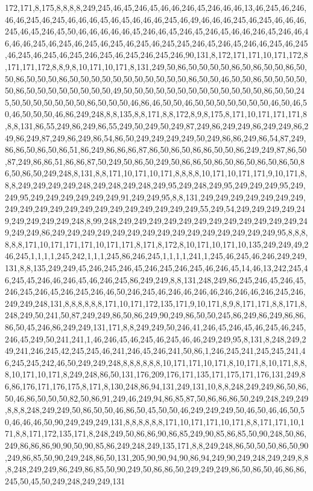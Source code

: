 172,171,8,175,8,8,8,8,249,245,46,45,246,45,46,46,246,45,246,46,46,13,46,245,46,246,46,46,245,46,245,46,46,46,45,46,45,46,46,46,245,46,49,46,46,46,245,46,245,46,46,46,245,46,45,246,45,50,46,46,46,46,46,45,246,46,45,246,45,246,45,46,46,246,45,246,46,46,46,46,245,46,245,46,245,46,245,46,245,46,245,245,246,45,246,45,246,46,245,46,245,46,245,46,245,46,245,246,245,46,245,246,245,246,90,131,8,172,171,171,10,171,172,8,171,171,172,8,8,9,8,10,171,10,171,8,131,249,50,86,50,50,50,50,86,50,86,50,50,86,50,50,86,50,50,50,86,50,50,50,50,50,50,50,50,50,50,50,86,50,50,46,50,50,86,50,50,50,50,50,86,50,50,50,50,50,50,50,50,49,50,50,50,50,50,50,50,50,50,50,50,50,50,86,50,50,245,50,50,50,50,50,50,50,86,50,50,50,46,86,46,50,50,46,50,50,50,50,50,50,50,46,50,46,50,46,50,50,50,46,86,249,248,8,8,135,8,8,171,8,8,172,8,9,8,175,8,171,10,171,171,171,8,8,8,131,86,55,249,86,249,86,55,249,50,249,50,249,87,249,86,249,249,86,249,249,86,249,86,249,87,249,86,249,86,54,86,50,249,249,249,249,50,249,86,86,249,86,54,87,249,86,86,50,86,50,86,51,86,249,86,86,86,87,86,50,86,50,86,86,50,50,86,249,249,87,86,50,87,249,86,86,51,86,86,87,50,249,50,86,50,249,50,86,86,50,86,50,86,50,86,50,86,50,86,50,86,50,249,248,8,131,8,8,171,10,171,10,171,8,8,8,8,10,171,10,171,171,9,10,171,8,8,8,249,249,249,249,248,249,248,249,248,249,95,249,248,249,95,249,249,249,95,249,249,95,249,249,249,249,249,249,91,249,249,95,8,8,131,249,249,249,249,249,249,249,249,249,249,249,249,249,249,249,249,249,249,249,249,55,249,54,249,249,249,249,249,249,249,249,249,248,8,99,248,249,249,249,249,249,249,249,249,249,249,249,249,249,249,249,86,249,249,249,249,249,249,249,249,249,249,249,249,249,249,249,95,8,8,8,8,8,8,171,10,171,171,171,10,171,171,8,171,8,172,8,10,171,10,171,10,135,249,249,49,246,245,1,1,1,1,245,242,1,1,1,245,86,246,245,1,1,1,1,241,1,245,46,245,46,246,249,249,131,8,8,135,249,249,45,246,245,246,45,246,245,246,245,46,246,45,14,46,13,242,245,46,245,45,246,46,246,45,46,246,245,86,249,249,8,8,131,248,249,86,245,246,45,246,45,246,245,246,45,246,245,246,46,50,246,245,46,246,46,246,46,246,246,46,246,245,246,249,249,248,131,8,8,8,8,8,8,171,10,171,172,135,171,9,10,171,8,9,8,171,171,8,8,171,8,248,249,50,241,50,87,249,249,86,50,86,249,90,249,86,50,50,245,86,249,86,249,86,86,86,50,45,246,86,249,249,131,171,8,8,249,249,50,246,41,246,45,246,45,46,245,46,245,246,45,249,50,241,241,1,46,246,45,46,245,46,245,46,46,249,249,95,8,131,8,248,249,249,241,246,245,42,245,245,46,241,246,45,246,241,50,86,1,246,245,241,245,245,241,46,245,245,242,46,50,249,249,248,8,8,8,8,8,8,10,171,171,10,171,8,10,171,8,10,171,8,8,8,10,171,10,171,8,249,248,86,50,131,176,209,176,171,135,171,175,171,176,131,249,86,86,176,171,176,175,8,171,8,130,248,86,94,131,249,131,10,8,8,248,249,249,86,50,86,50,46,86,50,50,50,82,50,86,91,249,46,249,94,86,85,87,50,86,86,86,50,249,248,249,249,8,8,8,248,249,249,50,86,50,50,46,86,50,45,50,50,46,249,249,249,50,46,50,46,46,50,50,46,46,46,50,90,249,249,249,131,8,8,8,8,8,8,171,10,171,171,10,171,8,8,171,171,10,171,8,8,171,172,135,171,8,248,249,50,86,86,90,86,85,249,90,85,86,85,50,90,248,50,86,249,86,86,86,90,90,50,90,85,86,249,248,249,135,171,8,8,249,248,86,50,50,50,86,50,90,249,86,85,50,90,249,248,86,50,131,205,90,90,94,90,86,94,249,90,249,248,249,249,8,8,8,248,249,249,86,249,86,85,50,90,249,50,86,86,50,249,249,249,86,50,86,50,46,86,86,245,50,45,50,249,248,249,249,131